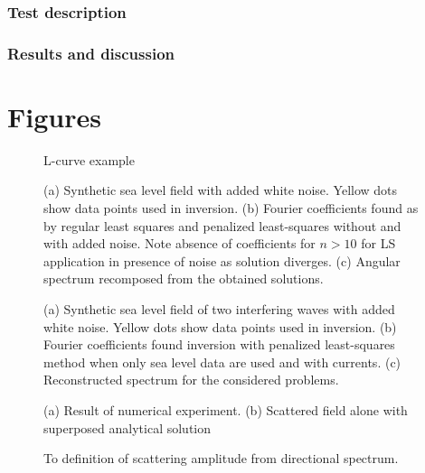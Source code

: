 \subsubsection{Test description}
\subsubsection{Results and discussion}

\newpage
\section{Figures}
\begin{figure}
	\centering
	\caption{L-curve example}
	\label{C1:F1.lcurve}
\end{figure}

\begin{figure}
	\caption{(a) Synthetic sea level field with added white noise. Yellow dots show data points 
	used in inversion. (b) Fourier coefficients found as by regular least squares and penalized 
	least-squares without and with added noise. Note absence of coefficients for $n > 10$ for LS 
	application in presence of noise as solution diverges. (c) Angular spectrum recomposed from the 
	obtained solutions.}
	\label{C1:F2.1w}
\end{figure}

\begin{figure}
	\label{C1:F2.2w}
	\centering
	\caption{(a) Synthetic sea level field of two interfering waves with added white noise. Yellow 
	dots show data points used in inversion. (b) Fourier coefficients found inversion with 
	penalized least-squares method when only sea level data are used and with currents. (c) 
	Reconstructed spectrum for the considered problems.}
\end{figure}

\begin{figure}
	\centering
	\caption{(a) Result of numerical experiment. (b) Scattered field alone with superposed 
		analytical solution}
\end{figure}

\begin{figure}
	\centering
	\caption{To definition of scattering amplitude from directional spectrum.}
\end{figure}

